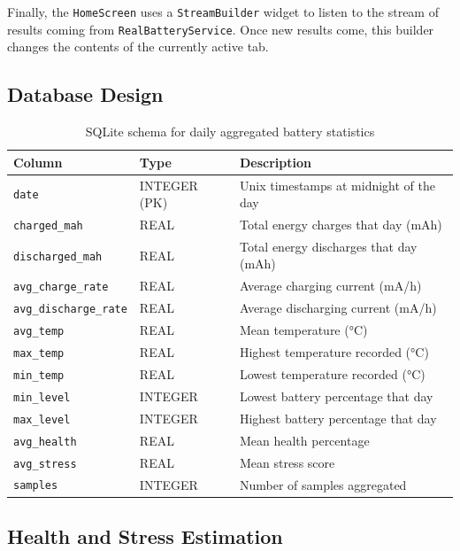\documentclass[12pt,a4paper]{report}
\begin{document}
Finally, the \texttt{HomeScreen} uses a \texttt{StreamBuilder} widget to listen to the stream of results coming from \texttt{RealBatteryService}. Once new results come, this builder changes the contents of the currently active tab.
\subsection{Database Design}

\begin{table}[H]
\caption{SQLite schema for daily aggregated battery statistics}
\centering
\small
\begin{tabular}{lll}
\toprule
\textbf{Column} & \textbf{Type} & \textbf{Description}\\
\midrule
\texttt{date}             & INTEGER (PK) & Unix timestamps at midnight of the day\\
\texttt{charged\_mah}     & REAL & Total energy charges that day (mAh)\\
\texttt{discharged\_mah}  & REAL & Total energy discharges that day (mAh)\\
\texttt{avg\_charge\_rate}& REAL & Average charging current (mA/h)\\
\texttt{avg\_discharge\_rate} & REAL & Average discharging current (mA/h)\\
\texttt{avg\_temp}        & REAL & Mean temperature (°C)\\
\texttt{max\_temp}        & REAL & Highest temperature recorded (°C)\\
\texttt{min\_temp}        & REAL & Lowest temperature recorded (°C)\\
\texttt{min\_level}       & INTEGER & Lowest battery percentage that day\\
\texttt{max\_level}       & INTEGER & Highest battery percentage that day\\
\texttt{avg\_health}      & REAL & Mean health percentage\\
\texttt{avg\_stress}      & REAL & Mean stress score\\
\texttt{samples}          & INTEGER & Number of samples aggregated\\
\bottomrule
\end{tabular}
\end{table}

\subsection{Health and Stress Estimation}
\end{document}
